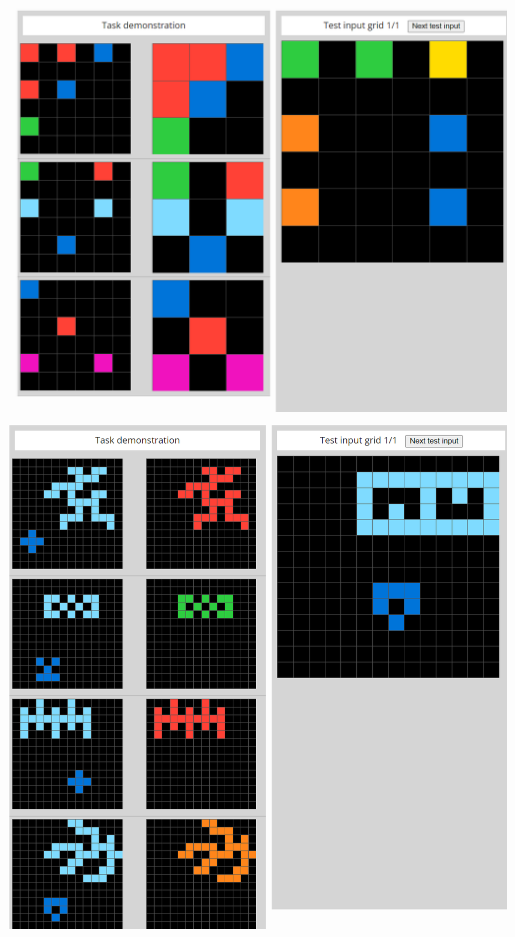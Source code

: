 \documentclass[letterpaper]{article} %
\begin{document}
\begin{center}
    \includegraphics[scale = 0.25]{solved_1.png}
    \vspace{\baselineskip}\vspace{\baselineskip}
    \includegraphics[scale = 0.25]{solved_2.png}
    \vspace{\baselineskip}\vspace{\baselineskip}

\end{center}
\end{document}
